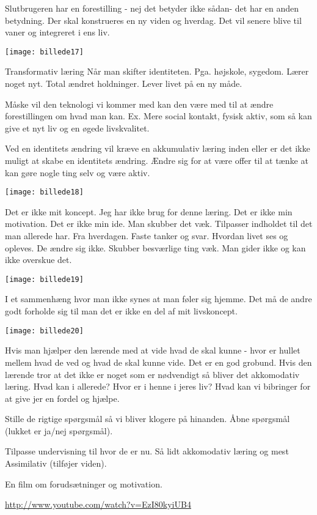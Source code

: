 \documentclass[12pt, letterpaper]{article}
\begin{document}
Slutbrugeren har en forestilling - nej det betyder ikke sådan- det har en anden betydning. Der skal konstrueres en ny viden og hverdag.
Det vil senere blive til vaner og integreret i ens liv.

\begin{center}
\texttt{[image: billede17]}
\end{center}

Transformativ læring
Når man skifter identiteten. Pga. højskole, sygedom. Lærer noget nyt. Total ændret holdninger. Lever livet på en ny måde.

Måske vil den teknologi vi kommer med kan den være med til at ændre forestillingen om hvad man kan. Ex. Mere social kontakt, fysisk aktiv, som så kan give et nyt liv og en øgede livskvalitet.

Ved en identitets ændring vil kræve en akkumulativ læring inden eller er det ikke muligt at skabe en identitets ændring. 
Ændre sig for at være offer til at tænke at kan gøre nogle ting selv og være aktiv.


\begin{center}
\texttt{[image: billede18]}
\end{center}

Det er ikke mit koncept. Jeg har ikke brug for denne læring. Det er ikke min motivation. Det er ikke min ide. Man skubber det væk. Tilpasser indholdet til det man allerede har. 
Fra hverdagen. Faste tanker og svar. Hvordan livet ses og opleves. De ændre sig ikke. Skubber besværlige ting væk. Man gider ikke og kan ikke overskue det.

\begin{center}
\texttt{[image: billede19]}
\end{center}

I et sammenhæng hvor man ikke synes at man føler sig hjemme. Det må de andre godt forholde sig til man det er ikke en del af mit livskoncept.


\begin{center}
\texttt{[image: billede20]}
\end{center}


Hvis man hjælper den lærende med at vide hvad de skal kunne - hvor er hullet mellem hvad de ved og hvad de skal kunne vide. Det er en god grobund. 
Hvis den lærende tror at det ikke er noget som er nødvendigt så bliver det akkomodativ læring. 
Hvad kan i allerede? Hvor er i henne i jeres liv? Hvad kan vi bibringer for at give jer en fordel og hjælpe.

Stille de rigtige spørgsmål så vi bliver klogere på hinanden. Åbne spørgsmål (lukket er ja/nej spørgsmål).

Tilpasse undervisning til hvor de er nu. Så lidt akkomodativ læring og mest Assimilativ (tilføjer viden).

En film om forudsætninger og motivation.\newline

\url{http://www.youtube.com/watch?v=EzI80kyiUB4}
\end{document}
